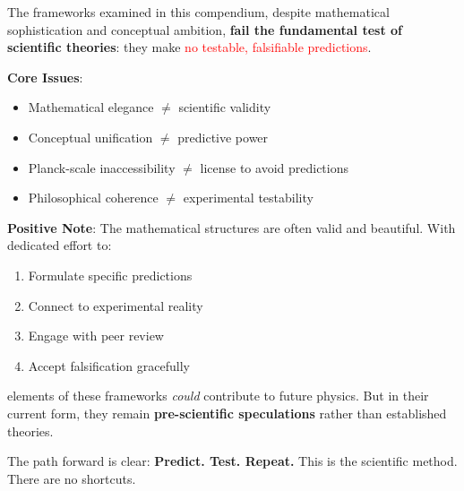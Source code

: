 The frameworks examined in this compendium, despite mathematical sophistication and conceptual ambition, \textbf{fail the fundamental test of scientific theories}: they make \textcolor{red}{no testable, falsifiable predictions}.

\textbf{Core Issues}:
\begin{itemize}
    \item Mathematical elegance $\neq$ scientific validity
    \item Conceptual unification $\neq$ predictive power
    \item Planck-scale inaccessibility $\neq$ license to avoid predictions
    \item Philosophical coherence $\neq$ experimental testability
\end{itemize}

\textbf{Positive Note}: The mathematical structures are often valid and beautiful. With dedicated effort to:
\begin{enumerate}
    \item Formulate specific predictions
    \item Connect to experimental reality
    \item Engage with peer review
    \item Accept falsification gracefully
\end{enumerate}

elements of these frameworks \textit{could} contribute to future physics. But in their current form, they remain \textbf{pre-scientific speculations} rather than established theories.

\begin{center}
\end{center}

The path forward is clear: \textbf{Predict. Test. Repeat.} This is the scientific method. There are no shortcuts.
